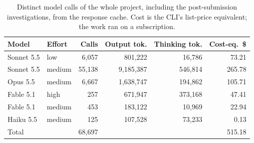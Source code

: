 \begin{table}[t]
\caption{Distinct model calls of the whole project, including the post-submission investigations, from the response cache. Cost is the CLI's list-price equivalent; the work ran on a subscription.}
\label{tab:usage}
\centering
\scriptsize
\begin{tabular}{@{}llrrrr@{}}
\toprule
Model & Effort & Calls & Output tok. & Thinking tok. & Cost-eq.\ \$ \\
\midrule
Sonnet 5.5 & low & 6,057 & 801,222 & 16,786 & 73.21 \\
Sonnet 5.5 & medium & 55,138 & 9,185,387 & 546,814 & 265.78 \\
Opus 5.5 & medium & 6,667 & 1,638,747 & 194,862 & 105.71 \\
Fable 5.1 & high & 257 & 671,947 & 373,168 & 47.41 \\
Fable 5.1 & medium & 453 & 183,122 & 10,969 & 22.94 \\
Haiku 5.5 & medium & 125 & 107,528 & 73,233 & 0.13 \\
\midrule
Total & & 68,697 & & & 515.18 \\
\bottomrule
\end{tabular}
\end{table}
